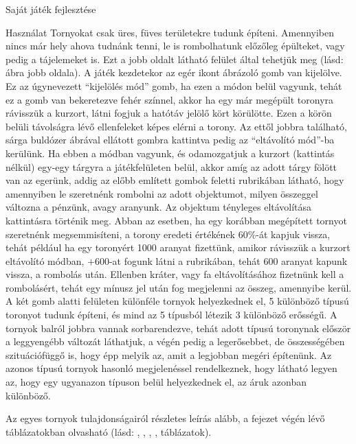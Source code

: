 \begin{MyChapter}{Saját játék fejlesztése}
\begin{MySection}{Használat}
		Tornyokat csak üres, füves területekre tudunk építeni. Amennyiben nincs már hely ahova tudnánk tenni, le is rombolhatunk előzőleg épülteket, vagy pedig a tájelemeket is. Ezt a jobb oldalt látható felület által tehetjük meg (lásd:  ábra jobb oldala).		
		A játék kezdetekor az egér ikont ábrázoló gomb van kijelölve. Ez az úgynevezett ``kijelölés mód'' gomb, ha ezen a módon belül vagyunk, tehát ez a gomb van bekeretezve fehér színnel, akkor ha egy már megépült toronyra rávisszük a kurzort, látni fogjuk a hatótáv jelölő kört körülötte. Ezen a körön belüli távolságra lévő ellenfeleket képes elérni a torony. %
		Az ettől jobbra található, sárga buldózer ábrával ellátott gombra kattintva pedig az ``eltávolító mód''-ba kerülünk. Ha ebben a módban vagyunk, és odamozgatjuk a kurzort (kattintás nélkül) egy-egy tárgyra a játékfelületen belül, akkor amíg az adott tárgy fölött van az egerünk, addig az előbb említett gombok feletti rubrikában látható, hogy amennyiben le szeretnénk rombolni az adott objektumot, milyen összeggel változna a pénzünk, avagy aranyunk. Az objektum tényleges eltávolítása kattintásra történik meg.
		Abban az esetben, ha egy korábban megépített tornyot szeretnénk megsemmisíteni, a torony eredeti értékének 60\%-át kapjuk vissza, tehát például ha egy toronyért 1000 aranyat fizettünk, amikor rávisszük a kurzort eltávolító módban, $+600$-at fogunk látni a rubrikában, tehát 600 aranyat kapunk vissza, a rombolás után. Ellenben kráter, vagy fa eltávolításához fizetnünk kell a rombolásért, tehát egy mínusz jel után fog megjelenni az összeg, amennyibe kerül.
		A két gomb alatti felületen különféle tornyok helyezkednek el, 5 különböző típusú toronyot tudunk építeni, és mind az 5 típusból létezik 3 különböző erősségű.
		A tornyok balról jobbra vannak sorbarendezve, tehát adott típusú toronynak először a leggyengébb változát láthatjuk, a végén pedig a legerősebbet, de összességében szituációfüggő is, hogy épp melyik az, amit a legjobban megéri építenünk. Az azonos típusú tornyok hasonló megjelenéssel rendelkeznek, hogy látható legyen az, hogy egy ugyanazon típuson belül helyezkednek el, az áruk azonban különböző.
		
		Az egyes tornyok tulajdonságairól részletes leírás alább, a fejezet végén lévő táblázatokban olvasható (lásd: , , , ,  táblázatok).
		

\end{MySection}
\end{MyChapter}

